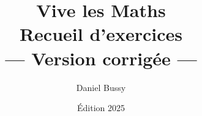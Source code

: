 \documentclass[12pt, a4paper]{book}
\begin{document}
\title{{\Huge\textbf{Vive les Maths}}\\[0.5em]
       \large Recueil d'exercices
       \ifdefined\AVECSOLUTIONS
         \\[0.3em]\textcolor{vlmgreen}{\large — Version corrigée —}
       \fi}
\author{Daniel Bussy}
\date{Édition 2025}
\maketitle
\tableofcontents

\newpage



\end{document}
